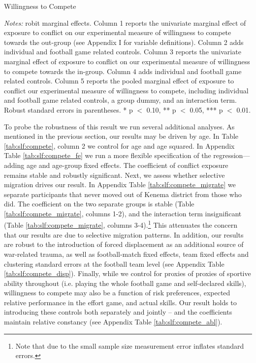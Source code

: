 \begin{threeparttable}[htb]
	\caption{Willingness to Compete}
	\label{tab:slf:compete}
	\centering
	\tiny
	
	\begin{tablenotes}
		\item \textit{Notes:} robit marginal effects. Column 1 reports the univariate marginal effect of exposure to conflict on our experimental measure of willingness to compete towards the out-group (see Appendix I for variable definitions). Column 2 adds individual and football game related controls. Column 3 reports the univariate marginal effect of exposure to conflict on our experimental measure of willingness to compete towards the in-group. Column 4 adds individual and football game related controls. Column 5 reports the pooled marginal effect of exposure to conflict our experimental measure of willingness to compete, including individual and football game related controls, a group dummy, and an interaction term. Robust standard errors in parentheses. * p $<$ 0.10, ** p $<$ 0.05, *** p $<$ 0.01.
		\item
	\end{tablenotes}
\end{threeparttable}


To probe the robustness of this result we run several additional analyses. As mentioned in the previous section, our results may be driven by age. In Table \ref{tab:slf:compete}, column 2 we control for age and age squared. In Appendix Table \ref{tab:slf:compete_fe} we run a more flexible specification of the regression—adding age and age-group fixed effects. The coefficient of conflict exposure remains stable and robustly significant. Next, we assess whether selective migration drives our result. In Appendix Table \ref{tab:slf:compete_migrate} we separate participants that never moved out of Kenema district from those who did. The coefficient on the two separate groups is stable (Table \ref{tab:slf:compete_migrate}, columns 1-2), and the interaction term insignificant (Table \ref{tab:slf:compete_migrate}, columns 3-4).\footnote{Note that due to the small sample size measurement error inflates standard errors.}  This attenuates the concern that our results are due to selective migration patterns. In addition, our results are robust to the introduction of forced displacement as an additional source of war-related trauma, as well as football-match fixed effects, team fixed effects and clustering standard errors at the football team level (see Appendix Table \ref{tab:slf:compete_disp}). Finally, while we control for proxies of proxies of sportive ability throughout (i.e. playing the whole football game and self-declared skills), willingness to compete may also be a function of risk preferences, expected relative performance in the effort game, and actual skills. Our result holds to introducing these controls both separately and jointly – and the coefficients maintain relative constancy (see Appendix Table \ref{tab:slf:compete_abl}).

